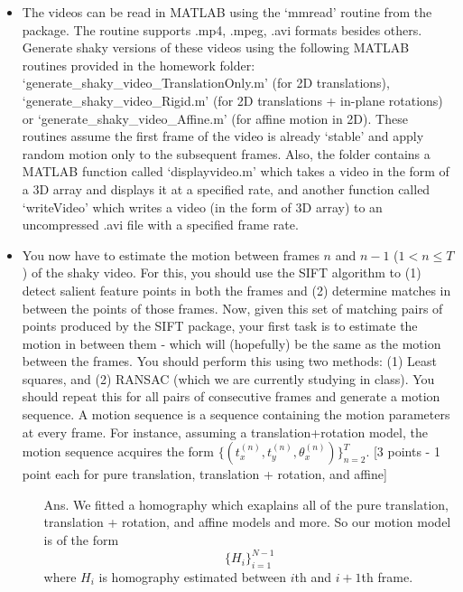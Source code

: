 \documentclass[11pt]{article}
\begin{document}
\begin{enumerate}
\begin{itemize}
\item The videos can be read in MATLAB using the `mmread' routine from the package. The routine supports .mp4, .mpeg, .avi formats besides others. Generate shaky versions of these videos using the following MATLAB routines provided in the homework folder: `generate\_shaky\_video\_TranslationOnly.m' (for 2D translations), `generate\_shaky\_video\_Rigid.m' (for 2D translations + in-plane rotations) or `generate\_shaky\_video\_Affine.m' (for affine motion in 2D). These routines assume the first frame of the video is already `stable' and apply random motion only to the subsequent frames. Also, the folder contains a  MATLAB function called `displayvideo.m' which takes a video in the form of a 3D array and displays it at a specified rate, and another function called `writeVideo' which writes a video (in the form of  3D array) to an uncompressed .avi file with a specified frame rate. 

\item You now have to estimate the motion between frames $n$ and $n-1$ ($1 < n \leq T$) of the shaky video. For this, you should use the SIFT algorithm to (1) detect salient feature points in both the frames and (2) determine matches in between the points of those frames. Now, given this set of matching pairs of points produced by the SIFT package, your first task is to estimate the motion in between them - which will (hopefully) be the same as the motion between the frames. You should perform this using two methods: (1) Least squares, and (2) RANSAC (which we are currently studying in class). You should repeat this for all pairs of consecutive frames and generate a motion sequence. A motion sequence is a sequence containing the motion parameters at every frame. For instance, assuming a translation+rotation model, the motion sequence acquires the form $\{(t^{(n)}_x,t^{(n)}_y,\theta^{(n)}_x)\}_{n=2}^{T}$.
\textsf{[3 points - 1 point each for pure translation, translation + rotation, and affine]}
\begin{itemize}
	\item[Ans.] We fitted a homography which exaplains all of the pure translation, translation + rotation, and affine models and more. So our motion model is of the form
		\[
		\{H_i\}_{i=1}^{N-1}
		\]
		where $H_i$ is homography estimated between $i$th and $i+1$th frame.
\end{itemize}



\end{itemize}
\end{enumerate}
\end{document}
